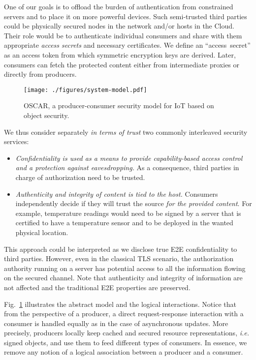 \documentclass[conference]{IEEEtran}
\begin{document}
One of our goals is to offload the burden of authentication from constrained servers and to place it on more powerful devices. Such semi-trusted third parties could be physically secured nodes in the network and/or hosts in the Cloud. Their role would be to authenticate individual consumers and share with them appropriate \textit{access secrets} and necessary certificates. We define an ``access~secret'' as an access token from which symmetric encryption keys are derived. Later, consumers can fetch the protected content either from intermediate proxies or directly from producers.




\begin{figure}[htbp]
\centering
\texttt{[image: ./figures/system-model.pdf]}
\caption{OSCAR, a producer-consumer security model for IoT based on object security.}
\label{fig:system-model}
\end{figure}

We thus consider separately \textit{in terms of trust} two commonly interleaved security services:
\begin{itemize}
\item \textit{Confidentiality is used as a means to provide capability-based access control and a protection against eavesdropping.} As a consequence, third parties in charge of authorization need to be trusted. 
\item \textit{Authenticity and integrity of content is tied to the host.} 
Consumers independently decide if they will trust the source \textit{for the provided content}. For example, temperature readings would need to be signed by a server that is certified to have a temperature sensor and to be deployed in the wanted physical location.
\end{itemize}

This approach could be interpreted as we disclose true E2E confidentiality 
to third parties. 
However, even in the classical TLS scenario,
the authorization authority running on a server has potential access to all the
information flowing on the secured channel. Note that authenticity and integrity of information are
not affected and the traditional E2E properties are preserved.


Fig.~\ref{fig:system-model} illustrates the abstract model and the logical
interactions. Notice that from the perspective of a producer, a direct request-response
interaction with a consumer is handled equally as in the case of asynchronous 
updates. More precisely, producers locally keep cached and secured
resource representations, \emph{i.e.} signed objects, and use them to feed different types of consumers.
In essence, we remove any notion of a logical association between a producer and
a consumer.
\end{document}
